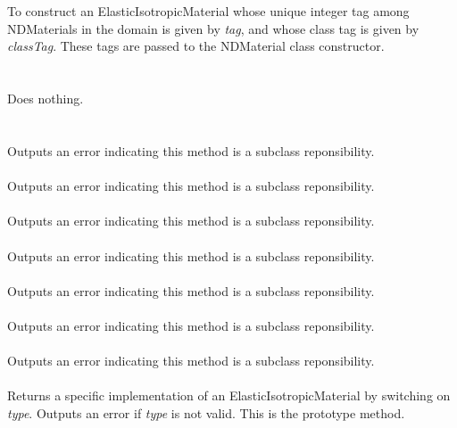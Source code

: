   \\
  \\
To construct an ElasticIsotropicMaterial whose unique integer tag
among NDMaterials in the domain is given by {\em tag}, and whose class
tag is given by {\em classTag}.  These tags are passed to the
NDMaterial class constructor. \\

 \\
 \\
Does nothing. \\ 

 \\
  \\
Outputs an error indicating this method is a subclass reponsibility. \\

 \\
Outputs an error indicating this method is a subclass reponsibility. \\

 \\
Outputs an error indicating this method is a subclass reponsibility. \\

 \\
Outputs an error indicating this method is a subclass reponsibility. \\

 \\
Outputs an error indicating this method is a subclass reponsibility. \\

 \\
Outputs an error indicating this method is a subclass reponsibility. \\

 \\
Outputs an error indicating this method is a subclass reponsibility. \\

 \\
Returns a specific implementation of an ElasticIsotropicMaterial by
switching on {\em type}.  Outputs an error if {\em type} is not valid.
This is the prototype method.